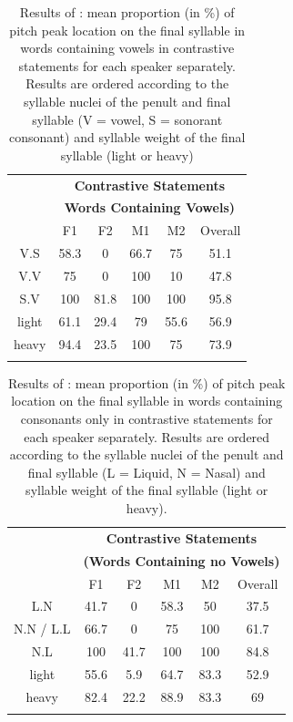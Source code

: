 \begin{table}
\centering
\caption{Results of \citet[250f.]{Grice.etal2015tash}: mean proportion (in \%) of pitch peak location on the final syllable in words containing vowels in contrastive statements for each speaker separately. Results are ordered according to the syllable nuclei of the penult and final syllable (V = vowel, S = sonorant consonant) and syllable weight of the final syllable (light or heavy)}
\label{tab:5.5}
\begin{tabular}{cccccc}
\lsptoprule
      & \multicolumn{5}{c}{\textbf{Contrastive Statements}} \\
      & \multicolumn{5}{c}{\textbf{Words Containing Vowels)}} \\
\cmidrule {2-6}
      & F1    & F2    & M1    & M2   &  Overall \\
\midrule
V.S   & 58.3  & 0     & 66.7  & 75   &  51.1    \\
V.V   & 75    & 0     & 100   & 10   &  47.8    \\
S.V   & 100   & 81.8  & 100   & 100  &  95.8    \\
\midrule
light & 61.1  & 29.4  & 79    & 55.6 &  56.9    \\
heavy & 94.4  & 23.5  & 100   & 75   &  73.9    \\
\lspbottomrule
\end{tabular}
\end{table}

\begin{table}
\centering
\caption{Results of \citet[250f.]{Grice.etal2015tash}: mean proportion (in \%) of pitch peak location on the final syllable in words containing consonants only in contrastive statements for each speaker separately. Results are ordered according to the syllable nuclei of the penult and final syllable (L = Liquid, N = Nasal) and syllable weight of the final syllable (light or heavy).}
\label{tab:5.6}
\begin{tabular}{cccccc}
\lsptoprule
      & \multicolumn{5}{c}{\textbf{Contrastive Statements}}\\
      & \multicolumn{5}{c}{\textbf{(Words Containing no Vowels)}} \\
\cmidrule {2-6}
          & F1        & F2        & M1        & M2       & Overall     \\
\midrule
L.N       & 41.7      & 0         & 58.3      & 50       & 37.5        \\
N.N / L.L & 66.7      & 0         & 75        & 100      & 61.7        \\
N.L       & 100       & 41.7      & 100       & 100      & 84.8        \\
\midrule
light     & 55.6      & 5.9       & 64.7      & 83.3     & 52.9        \\
heavy     & 82.4      & 22.2      & 88.9      & 83.3     & 69          \\
\lspbottomrule
\end{tabular}
\end{table}

